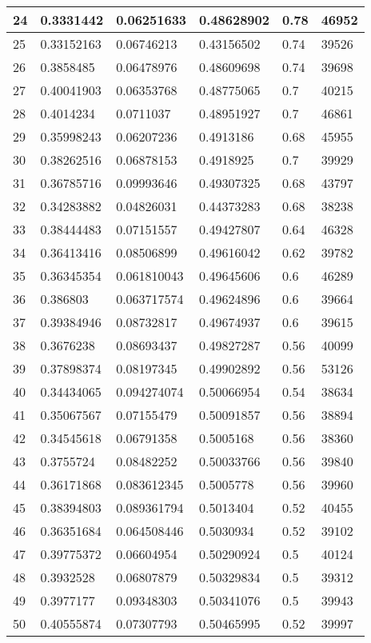 \begin{longtable}{|l|l|l|l|l|l|}
24 & 0.3331442 & 0.06251633 & 0.48628902 & 0.78 & 46952 \\ \hline 
25 & 0.33152163 & 0.06746213 & 0.43156502 & 0.74 & 39526 \\ \hline 
26 & 0.3858485 & 0.06478976 & 0.48609698 & 0.74 & 39698 \\ \hline 
27 & 0.40041903 & 0.06353768 & 0.48775065 & 0.7 & 40215 \\ \hline 
28 & 0.4014234 & 0.0711037 & 0.48951927 & 0.7 & 46861 \\ \hline 
29 & 0.35998243 & 0.06207236 & 0.4913186 & 0.68 & 45955 \\ \hline 
30 & 0.38262516 & 0.06878153 & 0.4918925 & 0.7 & 39929 \\ \hline 
31 & 0.36785716 & 0.09993646 & 0.49307325 & 0.68 & 43797 \\ \hline 
32 & 0.34283882 & 0.04826031 & 0.44373283 & 0.68 & 38238 \\ \hline 
33 & 0.38444483 & 0.07151557 & 0.49427807 & 0.64 & 46328 \\ \hline 
34 & 0.36413416 & 0.08506899 & 0.49616042 & 0.62 & 39782 \\ \hline 
35 & 0.36345354 & 0.061810043 & 0.49645606 & 0.6 & 46289 \\ \hline 
36 & 0.386803 & 0.063717574 & 0.49624896 & 0.6 & 39664 \\ \hline 
37 & 0.39384946 & 0.08732817 & 0.49674937 & 0.6 & 39615 \\ \hline 
38 & 0.3676238 & 0.08693437 & 0.49827287 & 0.56 & 40099 \\ \hline 
39 & 0.37898374 & 0.08197345 & 0.49902892 & 0.56 & 53126 \\ \hline 
40 & 0.34434065 & 0.094274074 & 0.50066954 & 0.54 & 38634 \\ \hline 
41 & 0.35067567 & 0.07155479 & 0.50091857 & 0.56 & 38894 \\ \hline 
42 & 0.34545618 & 0.06791358 & 0.5005168 & 0.56 & 38360 \\ \hline 
43 & 0.3755724 & 0.08482252 & 0.50033766 & 0.56 & 39840 \\ \hline 
44 & 0.36171868 & 0.083612345 & 0.5005778 & 0.56 & 39960 \\ \hline 
45 & 0.38394803 & 0.089361794 & 0.5013404 & 0.52 & 40455 \\ \hline 
46 & 0.36351684 & 0.064508446 & 0.5030934 & 0.52 & 39102 \\ \hline 
47 & 0.39775372 & 0.06604954 & 0.50290924 & 0.5 & 40124 \\ \hline 
48 & 0.3932528 & 0.06807879 & 0.50329834 & 0.5 & 39312 \\ \hline 
49 & 0.3977177 & 0.09348303 & 0.50341076 & 0.5 & 39943 \\ \hline 
50 & 0.40555874 & 0.07307793 & 0.50465995 & 0.52 & 39997 \\ \hline 
\end{longtable}